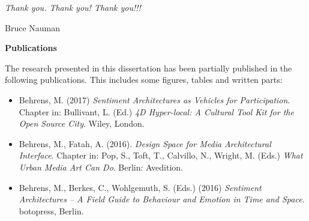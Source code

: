 \begin{acknowledgements}
\textit{Thank you. Thank you! Thank you!!!}

Bruce Nauman
\newpage

\listoftodos



\newpage


\textbf{Publications}

\begin{singlespace}{
The research presented in this dissertation has been partially published in the following publications. This includes some figures, tables and written parts:

\begin{itemize} 

\item Behrens, M. (2017) \textit{Sentiment Architectures as Vehicles for Participation}. Chapter in: Bullivant, L. (Ed.) \textit{4D Hyper-local: A Cultural Tool Kit for the Open Source City}. Wiley, London.

\item Behrens, M., Fatah, A. (2016). \textit{Design Space for Media Architectural Interface}. Chapter in: Pop, S., Toft, T., Calvillo, N., Wright, M. (Eds.) \textit{What Urban Media Art Can Do}. Berlin: Avedition.

\item Behrens, M., Berkes, C., Wohlgemuth, S. (Eds.) (2016) \textit{Sentiment Architectures – A Field Guide to Behaviour and Emotion in Time and Space.} botopress, Berlin.


\end{itemize}}
\end{singlespace}
\end{acknowledgements}
